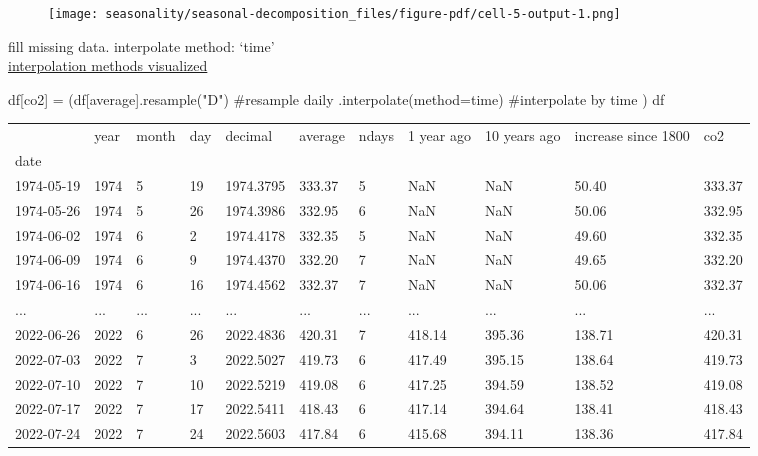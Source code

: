 \documentclass[
  letterpaper,
  DIV=11,
  numbers=noendperiod,
  oneside]{scrreprt}
\newenvironment{Shaded}{\begin{snugshade}}{\end{snugshade}}
\newcommand{\CommentTok}[1]{\textcolor[rgb]{0.37,0.37,0.37}{#1}}
\newcommand{\NormalTok}[1]{\textcolor[rgb]{0.00,0.23,0.31}{#1}}
\newcommand{\OperatorTok}[1]{\textcolor[rgb]{0.37,0.37,0.37}{#1}}
\newcommand{\StringTok}[1]{\textcolor[rgb]{0.13,0.47,0.30}{#1}}
\begin{document}
\begin{figure}[H]

{\centering \texttt{[image: seasonality/seasonal-decomposition\_files/figure-pdf/cell-5-output-1.png]}

}

\end{figure}

fill missing data. interpolate method: `time'\\
\href{https://thepythonyouneed.com/how-to-interpolate-values-with-pandas/}{interpolation
methods visualized}

\begin{Shaded}
\begin{Highlighting}[]
\NormalTok{df[}\StringTok{\textquotesingle{}co2\textquotesingle{}}\NormalTok{] }\OperatorTok{=}\NormalTok{ (df[}\StringTok{\textquotesingle{}average\textquotesingle{}}\NormalTok{].resample(}\StringTok{"D"}\NormalTok{) }\CommentTok{\#resample daily}
\NormalTok{                          .interpolate(method}\OperatorTok{=}\StringTok{\textquotesingle{}time\textquotesingle{}}\NormalTok{) }\CommentTok{\#interpolate by time}
\NormalTok{            )}
\NormalTok{df}
\end{Highlighting}
\end{Shaded}

\begin{longtable}[]{@{}lllllllllll@{}}
\toprule()
& year & month & day & decimal & average & ndays & 1 year ago & 10 years
ago & increase since 1800 & co2 \\
date & & & & & & & & & & \\
\midrule()
\endhead
1974-05-19 & 1974 & 5 & 19 & 1974.3795 & 333.37 & 5 & NaN & NaN & 50.40
& 333.37 \\
1974-05-26 & 1974 & 5 & 26 & 1974.3986 & 332.95 & 6 & NaN & NaN & 50.06
& 332.95 \\
1974-06-02 & 1974 & 6 & 2 & 1974.4178 & 332.35 & 5 & NaN & NaN & 49.60 &
332.35 \\
1974-06-09 & 1974 & 6 & 9 & 1974.4370 & 332.20 & 7 & NaN & NaN & 49.65 &
332.20 \\
1974-06-16 & 1974 & 6 & 16 & 1974.4562 & 332.37 & 7 & NaN & NaN & 50.06
& 332.37 \\
... & ... & ... & ... & ... & ... & ... & ... & ... & ... & ... \\
2022-06-26 & 2022 & 6 & 26 & 2022.4836 & 420.31 & 7 & 418.14 & 395.36 &
138.71 & 420.31 \\
2022-07-03 & 2022 & 7 & 3 & 2022.5027 & 419.73 & 6 & 417.49 & 395.15 &
138.64 & 419.73 \\
2022-07-10 & 2022 & 7 & 10 & 2022.5219 & 419.08 & 6 & 417.25 & 394.59 &
138.52 & 419.08 \\
2022-07-17 & 2022 & 7 & 17 & 2022.5411 & 418.43 & 6 & 417.14 & 394.64 &
138.41 & 418.43 \\
2022-07-24 & 2022 & 7 & 24 & 2022.5603 & 417.84 & 6 & 415.68 & 394.11 &
138.36 & 417.84 \\
\bottomrule()
\end{longtable}
\end{document}

